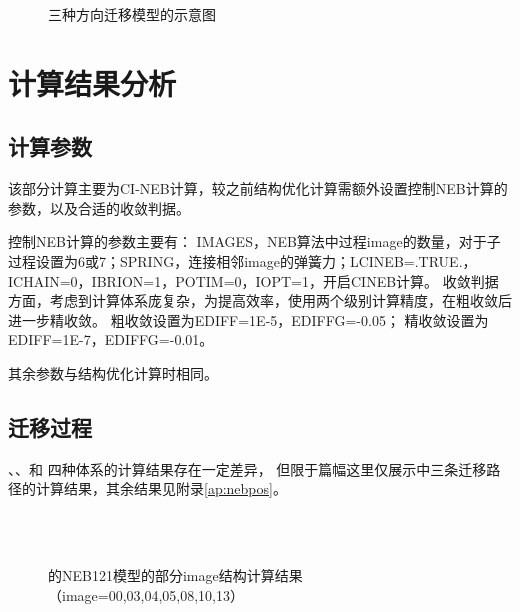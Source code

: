\begin{figure}[htbp]
    \centering
    \caption{三种方向迁移模型的示意图}
    \label{fig:111-neb-Li-path}
\end{figure}


\section{计算结果分析}

\subsection{计算参数}

该部分计算主要为CI-NEB计算，较之前结构优化计算需额外设置控制NEB计算的参数，以及合适的收敛判据。

控制NEB计算的参数主要有：
IMAGES，NEB算法中过程image的数量，对于子过程设置为6或7；SPRING，连接相邻image的弹簧力；LCINEB=.TRUE.，ICHAIN=0，IBRION=1，POTIM=0，IOPT=1，开启CINEB计算。
收敛判据方面，考虑到计算体系庞复杂，为提高效率，使用两个级别计算精度，在粗收敛后进一步精收敛。
粗收敛设置为EDIFF=1E-5，EDIFFG=-0.05；
精收敛设置为EDIFF=1E-7，EDIFFG=-0.01。

其余参数与结构优化计算时相同。

\subsection{迁移过程}

、、和 四种体系的计算结果存在一定差异，
但限于篇幅这里仅展示中三条迁移路径的计算结果，其余结果见附录\ref{ap:nebpos}。

\begin{figure}[htbp]
    \centering
     \\
     \\ 
    \caption{的NEB121模型的部分image结构计算结果（image=00,03,04,05,08,10,13）}
    \label{fig:111-neb121-contcar}
\end{figure}

